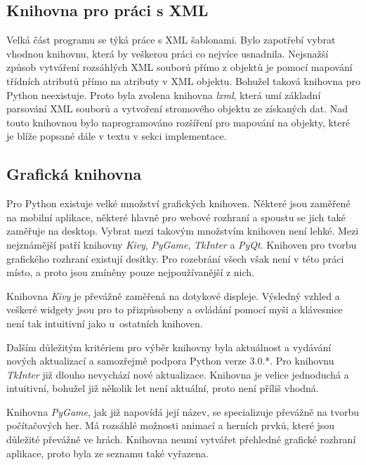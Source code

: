 \documentclass[thesis=B,czech]{resources/FITthesis}[2012/06/26]
\begin{document}
\subsection{Knihovna pro práci s XML}

Velká část programu se týká práce s XML šablonami. Bylo zapotřebí vybrat vhodnou knihovnu, která by veškerou práci co nejvíce usnadnila. Nejsnažší způsob vytváření rozsáhlých XML souborů přímo z objektů je pomocí mapování třídních atributů přímo na atributy v XML objektu. Bohužel taková knihovna pro Python neexistuje. Proto byla zvolena knihovna \textit{lxml}\cite{lxml}, která umí základní parsování XML souborů a vytvoření stromového objektu ze získaných dat. Nad touto knihovnou bylo naprogramováno rozšíření pro mapování na objekty, které je blíže popsané dále v textu v sekci implementace.



\subsection{Grafická knihovna}
Pro Python existuje velké množství grafických knihoven. Některé jsou zaměřené na mobilní aplikace, některé hlavně pro webové rozhraní a spoustu se jich také zaměřuje na desktop. Vybrat mezi takovým množstvím knihoven není lehké. Mezi nejznámější patří knihovny \textit{Kivy}, \textit{PyGame}, \textit{TkInter} a \textit{PyQt}. Knihoven pro tvorbu grafického rozhraní existují desítky. Pro rozebrání všech však není v této práci místo, a proto jsou zmíněny pouze nejpoužívanější z nich.\par

Knihovna \textit{Kivy} je převážně zaměřená na dotykové displeje. Výsledný vzhled a veškeré widgety jsou pro to přizpůsobeny a ovládání pomocí myši a klávesnice není tak intuitivní jako u~ostatních knihoven.\par

Dalším důležitým kritériem pro výběr knihovny byla aktuálnost a vydávání nových aktualizací a samozřejmě podpora Python verze 3.0.*. Pro knihovnu \textit{TkInter} již dlouho nevychází nové aktualizace. Knihovna je velice jednoduchá a intuitivní, bohužel již několik let není aktuální, proto není příliš vhodná. \par

Knihovna \textit{PyGame}, jak již napovídá její název, se specializuje převážně na tvorbu počítačových her. Má rozsáhlé možnosti animací a herních prvků, které jsou důležité převážně ve hrách. Knihovna neumí vytvářet přehledné grafické rozhraní aplikace, proto byla ze seznamu také vyřazena.\par
\end{document}

